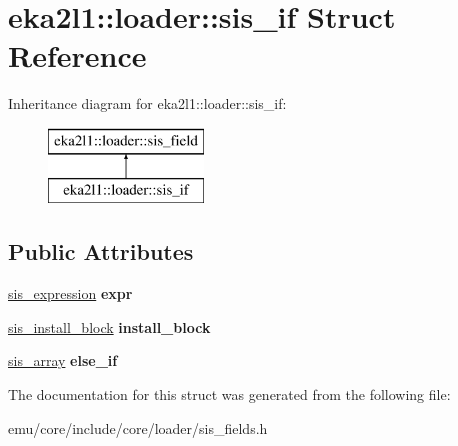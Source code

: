 \hypertarget{structeka2l1_1_1loader_1_1sis__if}{}\section{eka2l1\+:\+:loader\+:\+:sis\+\_\+if Struct Reference}
\label{structeka2l1_1_1loader_1_1sis__if}
Inheritance diagram for eka2l1\+:\+:loader\+:\+:sis\+\_\+if\+:\begin{figure}[H]
\begin{center}
\leavevmode
\includegraphics[height=2.000000cm]{structeka2l1_1_1loader_1_1sis__if}
\end{center}
\end{figure}
\subsection*{Public Attributes}
\begin{DoxyCompactItemize}
\item 
\mbox{\label{structeka2l1_1_1loader_1_1sis__if_adcd987046459a5e90b5c53c3e9203700}} 
\mbox{\hyperlink{structeka2l1_1_1loader_1_1sis__expression}{sis\+\_\+expression}} {\bfseries expr}
\item 
\mbox{\label{structeka2l1_1_1loader_1_1sis__if_a21508bdc6d2f3fb92862c3695ad9aed4}} 
\mbox{\hyperlink{structeka2l1_1_1loader_1_1sis__install__block}{sis\+\_\+install\+\_\+block}} {\bfseries install\+\_\+block}
\item 
\mbox{\label{structeka2l1_1_1loader_1_1sis__if_a73c0aed6fede059a2f47256f9de25143}} 
\mbox{\hyperlink{structeka2l1_1_1loader_1_1sis__array}{sis\+\_\+array}} {\bfseries else\+\_\+if}
\end{DoxyCompactItemize}


The documentation for this struct was generated from the following file\+:\begin{DoxyCompactItemize}
\item 
emu/core/include/core/loader/sis\+\_\+fields.\+h\end{DoxyCompactItemize}

